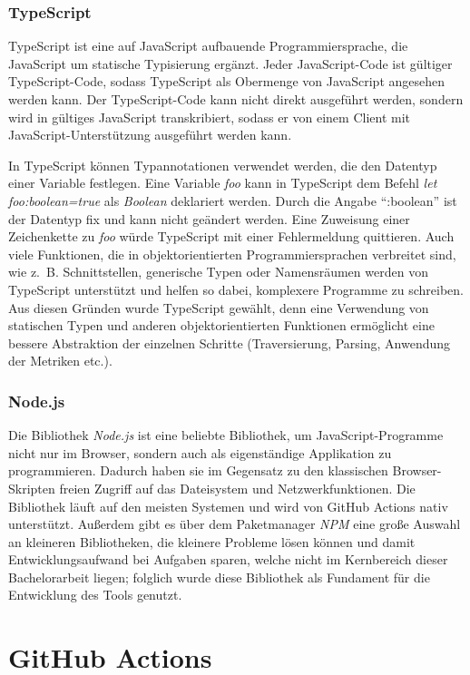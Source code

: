 \subsubsection{TypeScript}
TypeScript ist eine auf JavaScript aufbauende Programmiersprache, die JavaScript um statische Typisierung ergänzt. Jeder JavaScript-Code ist gültiger TypeScript-Code, sodass TypeScript als Obermenge von JavaScript angesehen werden kann. Der TypeScript-Code kann nicht direkt ausgeführt werden, sondern wird in gültiges JavaScript transkribiert, sodass er von einem Client mit JavaScript-Unterstützung ausgeführt werden kann. 

In TypeScript können Typannotationen verwendet werden, die den Datentyp einer Variable festlegen. Eine Variable \textit{foo} kann in TypeScript dem Befehl \textit{let foo:boolean=true} als \textit{Boolean} deklariert werden. Durch die Angabe \enquote{:boolean} ist der Datentyp fix und kann nicht geändert werden. Eine Zuweisung einer Zeichenkette zu \textit{foo} würde TypeScript mit einer Fehlermeldung quittieren. Auch viele Funktionen, die in objektorientierten Programmiersprachen verbreitet sind, wie z.~B. Schnittstellen, generische Typen oder Namensräumen werden von TypeScript unterstützt und helfen so dabei, komplexere Programme zu schreiben. Aus diesen Gründen wurde TypeScript gewählt, denn eine Verwendung von statischen Typen und anderen objektorientierten Funktionen ermöglicht eine bessere Abstraktion der einzelnen Schritte (Traversierung, Parsing, Anwendung der Metriken etc.). 

\subsubsection{ Node.js}
Die Bibliothek  \textit{Node.js} ist eine beliebte Bibliothek, um JavaScript-Programme nicht nur im Browser, sondern auch als eigenständige Applikation zu programmieren. Dadurch haben sie im Gegensatz zu den klassischen Browser-Skripten freien Zugriff auf das Dateisystem und Netzwerkfunktionen.  Die Bibliothek läuft auf den meisten Systemen und  wird von GitHub Actions nativ unterstützt. Außerdem gibt es über dem Paketmanager \textit{NPM} eine große Auswahl an kleineren Bibliotheken, die kleinere Probleme lösen können und damit Entwicklungsaufwand bei Aufgaben sparen, welche nicht im Kernbereich dieser Bachelorarbeit liegen; folglich wurde diese Bibliothek als Fundament für die Entwicklung des Tools genutzt. 

\section{GitHub Actions}\label{chapter:github_actions}

